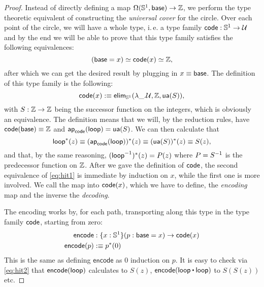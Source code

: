 \begin{proof}
Instead of directly defining a map $\Omega(\mathbb{S}^1, \mathsf{base}) \to \mathbb Z$,
we perform the type theoretic equivalent of constructing the
\emph{universal cover} for the circle.
Over each point of the circle, we will have a whole type, i.\,e. a type family
$\mathsf{code} : \mathbb{S}^1 \to \mathcal{U}$
and by the end we will be able to prove that this type family satisfies the
following equivalences:
\begin{equation}\label{eq:hit1}
(\mathsf{base} = x) \simeq \mathsf{code}(x) \simeq \mathbb Z \text{,}
\end{equation}
after which we can get the desired result by plugging in $x \equiv \mathsf{base}$.
The definition of this type family is the following:
\begin{equation*}
\mathsf{code}(x) :\equiv \mathsf{elim}_{\mathbb{S}^1}(\lambda \_.\mathcal{U}, \mathbb Z, \mathsf{ua}(S)) \text{,}
\end{equation*}
with $S : \mathbb Z \to \mathbb Z$ being the successor function on the integers, which
is obviously an equivalence.
The definition means that we will, by the reduction rules,
have $\mathsf{code}(\mathsf{base}) \equiv \mathbb Z$ and
$\mathsf{ap}_{\mathsf{code}}(\mathsf{loop}) = \mathsf{ua}(S)$.
We can then calculate that
\begin{equation}\label{eq:hit2}
\mathsf{loop}^*(z) \equiv (\mathsf{ap}_{\mathsf{code}}(\mathsf{loop}))^*(z) \equiv (\mathsf{ua}(S))^*(z) \equiv S(z) \text{,}
\end{equation}
and that, by the same reasoning, $(\mathsf{loop}^{-1})^*(z) = P(z)$ where
$P = S^{-1}$ is the predecessor function on $\mathbb Z$.
After we gave the definition of $\mathsf{code}$, the second equivalence of \eqref{eq:hit1}
is immediate by induction on $x$, while the first one is more involved.
We call the map into $\mathsf{code}(x)$, which we have to define,
the \emph{encoding} map and the inverse the \emph{decoding}.

The encoding works by, for each path, transporting along this type in the type
family $\mathsf{code}$, starting from zero:
\begin{align*}
\mathsf{encode} &: \{x : \mathbb{S}^1\}(p : \mathsf{base} = x) \to \mathsf{code}(x) \\
\mathsf{encode}(p) &:\equiv p^*(0)
\end{align*}
This is the same as defining $\mathsf{encode}$ as $0$ induction on $p$.
It is easy to check via \eqref{eq:hit2} that $\mathsf{encode}(\mathsf{loop})$
calculates to $S(z)$, $\mathsf{encode}(\Sloop \ct \Sloop)$ to
$S(S(z))$ etc.


\end{proof}
